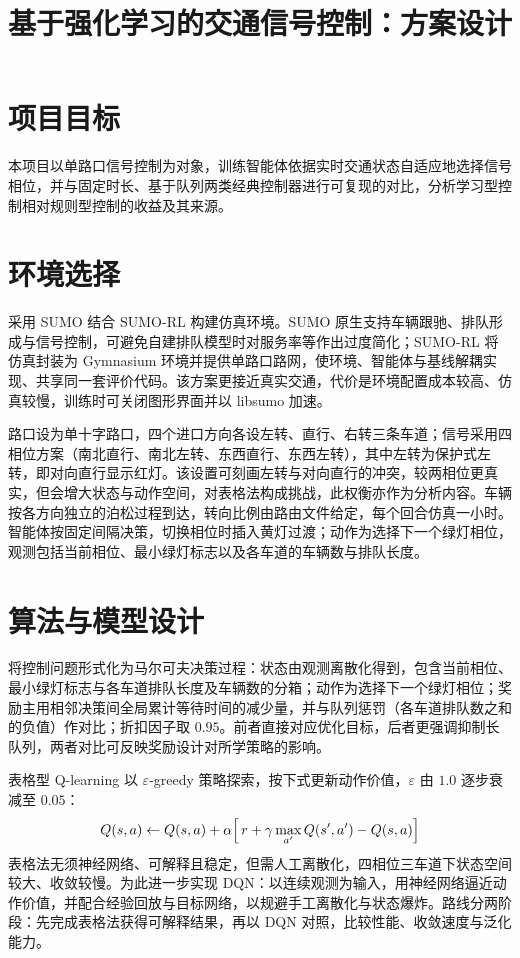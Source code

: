 \documentclass[heading=true]{ctexart}
\begin{document}
\title{基于强化学习的交通信号控制：方案设计}
\maketitle

\section{项目目标}
本项目以单路口信号控制为对象，训练智能体依据实时交通状态自适应地选择信号相位，并与固定时长、基于队列两类经典控制器进行可复现的对比，分析学习型控制相对规则型控制的收益及其来源。

\section{环境选择}

采用 SUMO 结合 SUMO-RL 构建仿真环境。SUMO 原生支持车辆跟驰、排队形成与信号控制，可避免自建排队模型时对服务率等作出过度简化；SUMO-RL 将仿真封装为 Gymnasium 环境并提供单路口路网，使环境、智能体与基线解耦实现、共享同一套评价代码。该方案更接近真实交通，代价是环境配置成本较高、仿真较慢，训练时可关闭图形界面并以 libsumo 加速。

路口设为单十字路口，四个进口方向各设左转、直行、右转三条车道；信号采用四相位方案（南北直行、南北左转、东西直行、东西左转），其中左转为保护式左转，即对向直行显示红灯。该设置可刻画左转与对向直行的冲突，较两相位更真实，但会增大状态与动作空间，对表格法构成挑战，此权衡亦作为分析内容。车辆按各方向独立的泊松过程到达，转向比例由路由文件给定，每个回合仿真一小时。智能体按固定间隔决策，切换相位时插入黄灯过渡；动作为选择下一个绿灯相位，观测包括当前相位、最小绿灯标志以及各车道的车辆数与排队长度。

\section{算法与模型设计}

将控制问题形式化为马尔可夫决策过程：状态由观测离散化得到，包含当前相位、最小绿灯标志与各车道排队长度及车辆数的分箱；动作为选择下一个绿灯相位；奖励主用相邻决策间全局累计等待时间的减少量，并与队列惩罚（各车道排队数之和的负值）作对比；折扣因子取 $0.95$。前者直接对应优化目标，后者更强调抑制长队列，两者对比可反映奖励设计对所学策略的影响。

表格型 Q-learning 以 $\varepsilon$-greedy 策略探索，按下式更新动作价值，$\varepsilon$ 由 $1.0$ 逐步衰减至 $0.05$：
\begin{equation}
Q(s,a)\leftarrow Q(s,a)+\alpha\Bigl[\,r+\gamma\max_{a'}Q(s',a')-Q(s,a)\Bigr]
\end{equation}
表格法无须神经网络、可解释且稳定，但需人工离散化，四相位三车道下状态空间较大、收敛较慢。为此进一步实现 DQN：以连续观测为输入，用神经网络逼近动作价值，并配合经验回放与目标网络，以规避手工离散化与状态爆炸。路线分两阶段：先完成表格法获得可解释结果，再以 DQN 对照，比较性能、收敛速度与泛化能力。
\end{document}
